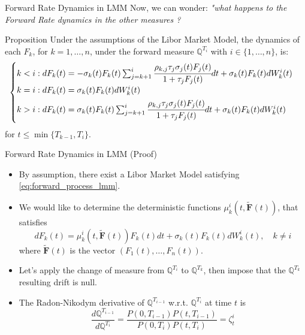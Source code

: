 \documentclass{beamer}
\begin{document}
\begin{frame}{Forward Rate Dynamics in LMM}
	Now, we can wonder: \emph{"what happens to the Forward Rate dynamics in the other measures ?}
 	\begin{block}{Proposition}
    Under the assumptions of the Libor Market Model, the dynamics of each $F_k$, for $k = 1,\ldots, n$, under the forward measure $\mathbb{Q}^{T_i}$ with $i \in \{1,\ldots, n\}$, is:
    \begin{equation}
      \begin{cases}
	k < i: dF_k(t) = -\sigma_k(t)F_k(t)\sum_{j=k+1}^i\cfrac{\rho_{k,j}\tau_j\sigma_j(t)F_j(t)}{1+\tau_jF_j(t)}dt + \sigma_k(t)F_k(t)dW^i_k(t) \\ \vspace{0.1cm}
	k = i : dF_k(t) = \sigma_k(t)F_k(t)dW_k^i(t) \\
	\vspace{0.1cm}
	k > i : dF_k(t) = \sigma_k(t)F_k(t)\sum_{j=k+1}^i\cfrac{\rho_{k,j}\tau_j\sigma_j(t)F_j(t)}{1+\tau_jF_j(t)}dt + \sigma_k(t)F_k(t)dW^i_k(t)
      \end{cases}
  	\label{eq:forward_rat_dynamics_lfm}
    \end{equation}
    for $t \le \min\{T_{k-1}, T_i\}$.
  \end{block}
\end{frame}

\begin{frame}{Forward Rate Dynamics in LMM (Proof)}
  \begin{itemize}
  \item<1-> By assumption, there exist a Libor Market Model satisfying \cref{eq:forward_process_lmm}.
  \item<2-> We would like to determine the deterministic functions $\mu_k^i(t, \bm{\tilde{F}}(t))$, that satisfies
    \begin{equation}
      dF_k(t) = \mu_k^i(t, \bm{\tilde{F}}(t))F_k(t)dt + \sigma_k(t)F_k(t)dW^i_k(t),\quad k\neq i
      \label{eq:forward_dynamics_in_lfm}
    \end{equation}
 where $\bm{\tilde{F}}(t)$ is the vector $(F_1(t),\ldots, F_n(t))$.
  \item<3-> Let's apply the change of measure from $\mathbb{Q}^{T_i}$ to $\mathbb{Q}^{T_k}$, then impose that the $\mathbb{Q}^{T_k}$ resulting drift is null.
  \item<4-> The Radon-Nikodym derivative of $\mathbb{Q}^{T_{i-1}}$ w.r.t. $\mathbb{Q}^{T_i}$ at time $t$ is
    \begin{equation*}
      \frac{d\mathbb{Q}^{T_{i-1}}}{d\mathbb{Q}^{T_i}} = \frac{P(0, T_{i-1})P(t, T_{i-1})}{P(0, T_i)P(t, T_i)} = \zeta^i_t
    \end{equation*}
  \end{itemize}
\end{frame}
\end{document}
